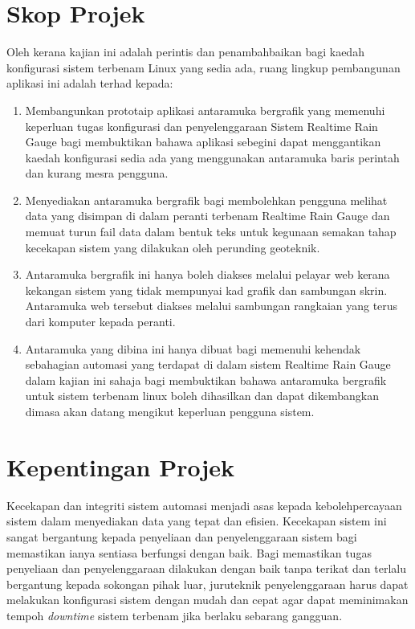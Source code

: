 \section{Skop Projek}
Oleh kerana kajian ini adalah perintis dan penambahbaikan bagi kaedah konfigurasi sistem terbenam Linux yang sedia ada, ruang lingkup pembangunan aplikasi ini adalah terhad kepada:
\bgroup
\renewcommand\theenumi{\roman{enumi}}
\begin{enumerate}
\item Membangunkan prototaip aplikasi antaramuka bergrafik yang memenuhi keperluan tugas konfigurasi dan penyelenggaraan Sistem Realtime Rain Gauge bagi membuktikan bahawa aplikasi sebegini dapat menggantikan kaedah konfigurasi sedia ada yang menggunakan antaramuka baris perintah dan kurang mesra pengguna.

\item Menyediakan antaramuka bergrafik bagi membolehkan pengguna melihat data yang disimpan di dalam peranti terbenam Realtime Rain Gauge dan memuat turun fail data dalam bentuk teks untuk kegunaan semakan tahap kecekapan sistem yang dilakukan oleh perunding geoteknik.

\item Antaramuka bergrafik ini hanya boleh diakses melalui pelayar web kerana kekangan sistem yang tidak mempunyai kad grafik dan sambungan skrin. Antaramuka web tersebut diakses melalui sambungan rangkaian yang terus dari komputer kepada peranti.

\item Antaramuka yang dibina ini hanya dibuat bagi memenuhi kehendak sebahagian automasi yang terdapat di dalam sistem Realtime Rain Gauge dalam kajian ini sahaja bagi membuktikan bahawa antaramuka bergrafik untuk sistem terbenam linux boleh dihasilkan dan dapat dikembangkan dimasa akan datang mengikut keperluan pengguna sistem.

\end{enumerate}
\egroup


\section{Kepentingan Projek}
Kecekapan dan integriti sistem automasi menjadi asas kepada kebolehpercayaan sistem dalam menyediakan data yang tepat dan efisien. Kecekapan sistem ini sangat bergantung kepada penyeliaan dan penyelenggaraan sistem bagi memastikan ianya sentiasa berfungsi dengan baik. Bagi memastikan tugas penyeliaan dan penyelenggaraan dilakukan dengan baik tanpa terikat dan terlalu bergantung kepada sokongan pihak luar, juruteknik penyelenggaraan harus dapat melakukan konfigurasi sistem dengan mudah dan cepat agar dapat meminimakan tempoh \textit{downtime} sistem terbenam jika berlaku sebarang gangguan.

